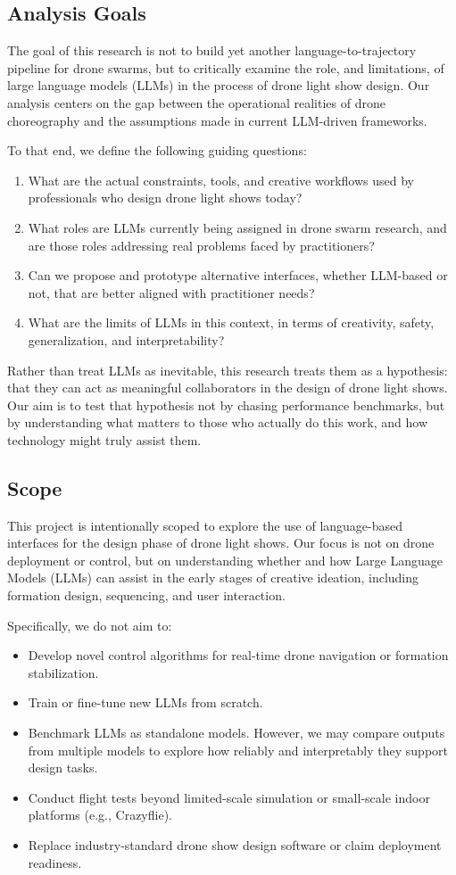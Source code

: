 \subsection{Analysis Goals}
The goal of this research is not to build yet another language-to-trajectory pipeline for drone swarms, but to critically examine the role, and limitations, of large language models (LLMs) in the process of drone light show design. Our analysis centers on the gap between the operational realities of drone choreography and the assumptions made in current LLM-driven frameworks.

To that end, we define the following guiding questions:
\begin{enumerate}
  \item What are the actual constraints, tools, and creative workflows used by professionals who design drone light shows today?
  \item What roles are LLMs currently being assigned in drone swarm research, and are those roles addressing real problems faced by practitioners?
  \item Can we propose and prototype alternative interfaces, whether LLM-based or not, that are better aligned with practitioner needs?
  \item What are the limits of LLMs in this context, in terms of creativity, safety, generalization, and interpretability?
\end{enumerate}

Rather than treat LLMs as inevitable, this research treats them as a hypothesis: that they can act as meaningful collaborators in the design of drone light shows. Our aim is to test that hypothesis not by chasing performance benchmarks, but by understanding what matters to those who actually do this work, and how technology might truly assist them.

\subsection{Scope}
This project is intentionally scoped to explore the use of language-based interfaces for the design phase of drone light shows. Our focus is not on drone deployment or control, but on understanding whether and how Large Language Models (LLMs) can assist in the early stages of creative ideation, including formation design, sequencing, and user interaction.

Specifically, we do not aim to:
\begin{itemize}
  \item Develop novel control algorithms for real-time drone navigation or formation stabilization.
  \item Train or fine-tune new LLMs from scratch.
  \item Benchmark LLMs as standalone models. However, we may compare outputs from multiple models to explore how reliably and interpretably they support design tasks.
  \item Conduct flight tests beyond limited-scale simulation or small-scale indoor platforms (e.g., Crazyflie).
  \item Replace industry-standard drone show design software or claim deployment readiness.
\end{itemize}

